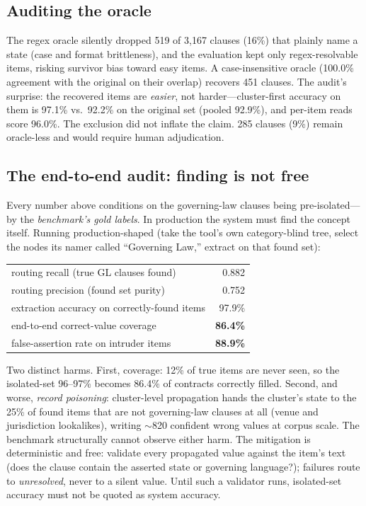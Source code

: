 \documentclass[11pt]{article}
\begin{document}
\subsection{Auditing the oracle}\label{sec:oracle}
The regex oracle silently dropped 519 of 3{,}167 clauses (16\%) that plainly name a state (case and format brittleness), and the evaluation kept only regex-resolvable items, risking survivor bias toward easy items. A case-insensitive oracle (100.0\% agreement with the original on their overlap) recovers 451 clauses. The audit's surprise: the recovered items are \emph{easier}, not harder---cluster-first accuracy on them is 97.1\% vs.\ 92.2\% on the original set (pooled 92.9\%), and per-item reads score 96.0\%. The exclusion did not inflate the claim. 285 clauses (9\%) remain oracle-less and would require human adjudication.

\subsection{The end-to-end audit: finding is not free}\label{sec:e2e}
Every number above conditions on the governing-law clauses being pre-isolated---by the \emph{benchmark's gold labels}. In production the system must find the concept itself. Running production-shaped (take the tool's own category-blind tree, select the nodes its namer called ``Governing Law,'' extract on that found set):

\begin{center}
\begin{tabular}{lr}
\toprule
routing recall (true GL clauses found) & 0.882 \\
routing precision (found set purity) & 0.752 \\
extraction accuracy on correctly-found items & 97.9\% \\
end-to-end correct-value coverage & \textbf{86.4\%} \\
false-assertion rate on intruder items & \textbf{88.9\%} \\
\bottomrule
\end{tabular}
\end{center}

Two distinct harms. First, coverage: 12\% of true items are never seen, so the isolated-set 96--97\% becomes 86.4\% of contracts correctly filled. Second, and worse, \emph{record poisoning}: cluster-level propagation hands the cluster's state to the 25\% of found items that are not governing-law clauses at all (venue and jurisdiction lookalikes), writing $\sim$820 confident wrong values at corpus scale. The benchmark structurally cannot observe either harm. The mitigation is deterministic and free: validate every propagated value against the item's text (does the clause contain the asserted state or governing language?); failures route to \emph{unresolved}, never to a silent value. Until such a validator runs, isolated-set accuracy must not be quoted as system accuracy.
\end{document}
